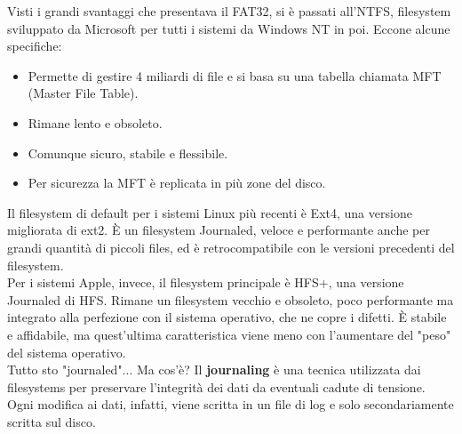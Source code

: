 \documentclass[a4paper]{report}
\begin{document}
Visti i grandi svantaggi che presentava il FAT32, si è passati all'NTFS, filesystem sviluppato da Microsoft per tutti i sistemi da Windows NT in poi.
Eccone alcune specifiche:
\begin{itemize}
\item Permette di gestire 4 miliardi di file e si basa su una tabella
chiamata MFT (Master File Table).
\item Rimane lento e obsoleto.
\item Comunque sicuro, stabile e flessibile.
\item Per sicurezza la MFT è replicata in più zone del disco.
\end{itemize}
Il filesystem di default per i sistemi Linux più recenti è Ext4, una versione migliorata di ext2. È un filesystem Journaled, veloce e performante anche per grandi quantità di piccoli files, ed è retrocompatibile con le versioni precedenti del filesystem.\\
Per i sistemi Apple, invece, il filesystem principale è HFS+, una versione Journaled di HFS. Rimane un filesystem vecchio e obsoleto, poco performante ma integrato alla perfezione con il sistema operativo, che ne copre i difetti. È stabile e affidabile, ma quest'ultima caratteristica viene meno con l'aumentare del "peso" del sistema operativo.\\
Tutto sto "journaled"... Ma cos'è? Il \textbf{journaling} è una tecnica utilizzata dai filesystems per preservare l'integrità dei dati da eventuali cadute di tensione. Ogni modifica ai dati, infatti, viene scritta in un file di log e solo secondariamente scritta sul disco.\\
\end{document}

